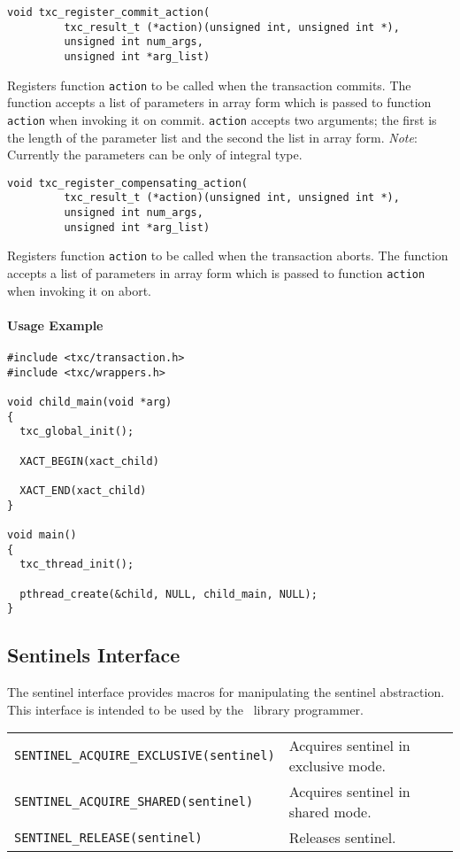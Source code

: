 \begin{verbatim}
void txc_register_commit_action(
         txc_result_t (*action)(unsigned int, unsigned int *), 
         unsigned int num_args, 
         unsigned int *arg_list)
\end{verbatim}
Registers function \texttt{action} to be called when the transaction commits.
The function accepts a list of parameters in array form which is passed to 
function \texttt{action} when invoking it on commit.
\texttt{action} accepts two arguments; the first is the length of the parameter 
list and the second the list in array form. \textit{Note}: Currently the parameters 
can be only of integral type. 


\begin{verbatim}
void txc_register_compensating_action(
         txc_result_t (*action)(unsigned int, unsigned int *), 
         unsigned int num_args, 
         unsigned int *arg_list)
\end{verbatim}
Registers function \texttt{action} to be called when the transaction aborts.
The function accepts a list of parameters in array form which is passed to 
function \texttt{action} when invoking it on abort.

\paragraph{Usage Example}
\begin{verbatim}
#include <txc/transaction.h>
#include <txc/wrappers.h>

void child_main(void *arg)
{
  txc_global_init();

  XACT_BEGIN(xact_child)

  XACT_END(xact_child)
}

void main()
{
  txc_thread_init();

  pthread_create(&child, NULL, child_main, NULL);
}
\end{verbatim}

\subsection{Sentinels Interface}

The sentinel interface provides macros for manipulating the sentinel
abstraction.
This interface is intended to be used by the \xcalls~library programmer.

\begin{tabular*}{12cm}{ll}
\verb!SENTINEL_ACQUIRE_EXCLUSIVE(sentinel)! & Acquires sentinel in exclusive mode. \\
\verb!SENTINEL_ACQUIRE_SHARED(sentinel)! & Acquires sentinel in shared mode.			\\
\verb!SENTINEL_RELEASE(sentinel)! & Releases sentinel.
\end{tabular*}


